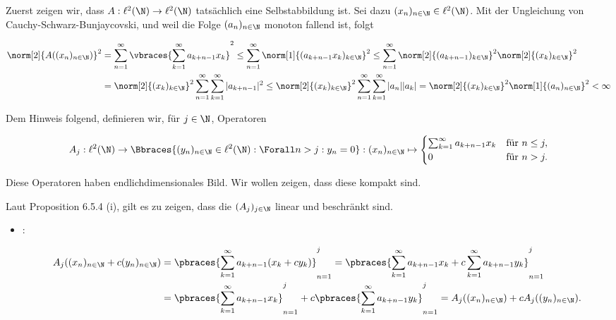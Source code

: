 \begin{solution}

Zuerst zeigen wir, dass $A: \ell^2(\N) \to \ell^2(\N)$ tatsächlich eine Selbstabbildung ist.
Sei dazu $(x_n)_{n \in \N} \in \ell^2(\N)$.
Mit der Ungleichung von Cauchy-Schwarz-Bunjaycovski, und weil die Folge $(a_n)_{n \in \N}$ monoton fallend ist, folgt

\begin{align*}
  \norm[2]{A((x_n)_{n \in \N})}^2
  & =
  \sum_{n=1}^\infty
  \vbraces
  {
    \sum_{k=1}^\infty
    a_{k+n-1} x_k
  }^2
  \leq
  \sum_{n=1}^\infty
  \norm[1]{(a_{k+n-1} x_k)_{k \in \N}}^2
  \leq
  \sum_{n=1}^\infty
  \norm[2]{(a_{k+n-1})_{k \in \N}}^2
  \norm[2]{(x_k)_{k \in \N}}^2 \\
  & =
  \norm[2]{(x_k)_{k \in \N}}^2
  \sum_{n=1}^\infty
  \sum_{k=1}^\infty
  |a_{k+n-1}|^2
  \leq
  \norm[2]{(x_k)_{k \in \N}}^2
  \sum_{n=1}^\infty
  \sum_{k=1}^\infty
  |a_n| |a_k|
  =
  \norm[2]{(x_k)_{k \in \N}}^2
  \norm[1]{(a_n)_{n \in \N}}^2 < \infty
\end{align*}

Dem Hinweis folgend, definieren wir, für $j \in \N$, Operatoren

\begin{align*}
  A_j:
  \ell^2(\N)
  \to
  \Bbraces
  {
    (y_n)_{n \in \N} \in \ell^2(\N):
    \Forall n > j:
    y_n = 0
  }:
  (x_n)_{n \in \N}
  \mapsto
  \begin{cases}
    \sum_{k=1}^\infty
    a_{k+n-1} x_k
    &
    \text{für } n \leq j, \\
    0
    &
    \text{für } n > j.
  \end{cases}
\end{align*}

Diese Operatoren haben endlichdimensionales Bild.
Wir wollen zeigen, dass diese kompakt sind.


Laut Proposition 6.5.4 (i), gilt es zu zeigen, dass die $(A_j)_{j \in \N}$ linear und beschränkt sind.

\begin{itemize}

  \item
  :

  \begin{align*}
    A_j((x_n)_{n \in \N} + c (y_n)_{n \in \N})
    & =
    \pbraces
    {
      \sum_{k=1}^\infty
      a_{k+n-1}
      (x_k + c y_k)
    }_{n=1}^j
    =
    \pbraces
    {
      \sum_{k=1}^\infty
      a_{k+n-1} x_k +
      c
      \sum_{k=1}^\infty
      a_{k+n-1} y_k
    }_{n=1}^j \\
    & =
    \pbraces
    {
      \sum_{k=1}^\infty
      a_{k+n-1} x_k
    }_{n=1}^j +
    c \pbraces
    {
      \sum_{k=1}^\infty
      a_{k+n-1} y_k
    }_{n=1}^j
    =
    A_j((x_n)_{n \in \N}) +
    c
    A_j((y_n)_{n \in \N}).
  \end{align*}


\end{itemize}
\end{solution}
